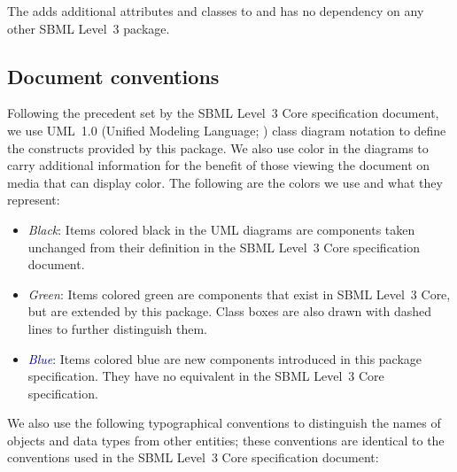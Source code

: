 The \FBCPackage adds additional attributes and classes to \sbmlthreecore and has no dependency on any other SBML Level~3 package.


\subsection{Document conventions} \label{conventions}

Following the precedent set by the SBML Level~3 Core specification
document, we use UML~1.0 (Unified Modeling Language;
\citealt{eriksson:1998,oestereich:1999}) class diagram notation to
define the constructs provided by this package. We also use color in the
diagrams to carry additional information for the benefit of those
viewing the document on media that can display color. The following are
the colors we use and what they represent:

\begin{itemize}

\item[\raisebox{2.75pt}{\colorbox{black}{\rule{0.8pt}{0.8pt}}}]
\emph{Black}: Items colored black in the UML diagrams are components
taken unchanged from their definition in the SBML Level~3 Core
specification document.

\item[\raisebox{2.75pt}{\colorbox{mediumgreen}{\rule{0.8pt}{0.8pt}}}]
\emph{\textcolor{mediumgreen}{Green}}: Items colored green are
components that exist in SBML Level~3 Core, but are extended by this
package. Class boxes are also drawn with dashed lines to further
distinguish them.

\item[\raisebox{2.75pt}{\colorbox{darkblue}{\rule{0.8pt}{0.8pt}}}]
\emph{\textcolor{darkblue}{Blue}}: Items colored blue are new components
introduced in this package specification. They have no equivalent in the
SBML Level~3 Core specification.


\end{itemize}

We also use the following typographical conventions to distinguish the
names of objects and data types from other entities; these conventions
are identical to the conventions used in the SBML Level~3 Core
specification document:

